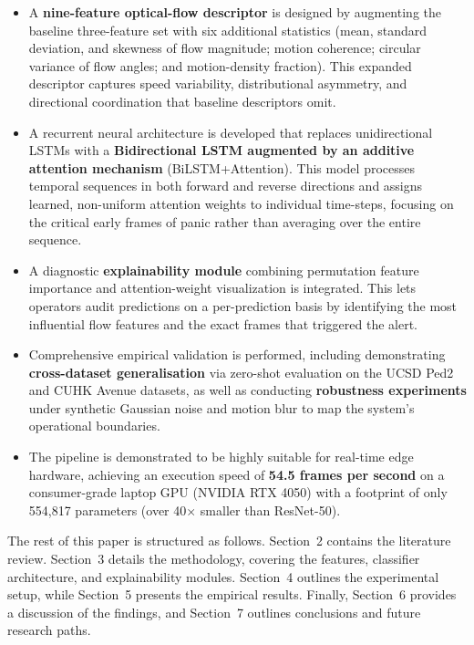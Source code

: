 \begin{itemize}
  \item A \textbf{nine-feature optical-flow descriptor} is designed by augmenting the baseline three-feature set with six additional statistics (mean, standard deviation, and skewness of flow magnitude; motion coherence; circular variance of flow angles; and motion-density fraction). This expanded descriptor captures speed variability, distributional asymmetry, and directional coordination that baseline descriptors omit.

  \item A recurrent neural architecture is developed that replaces unidirectional LSTMs with a \textbf{Bidirectional LSTM augmented by an additive attention mechanism} (BiLSTM+Attention). This model processes temporal sequences in both forward and reverse directions and assigns learned, non-uniform attention weights to individual time-steps, focusing on the critical early frames of panic rather than averaging over the entire sequence.

  \item A diagnostic \textbf{explainability module} combining permutation feature importance and attention-weight visualization is integrated. This lets operators audit predictions on a per-prediction basis by identifying the most influential flow features and the exact frames that triggered the alert.

  \item Comprehensive empirical validation is performed, including demonstrating \textbf{cross-dataset generalisation} via zero-shot evaluation on the UCSD Ped2 and CUHK Avenue datasets, as well as conducting \textbf{robustness experiments} under synthetic Gaussian noise and motion blur to map the system's operational boundaries.

  \item The pipeline is demonstrated to be highly suitable for real-time edge hardware, achieving an execution speed of \textbf{54.5 frames per second} on a consumer-grade laptop GPU (NVIDIA RTX 4050) with a footprint of only 554{,}817 parameters (over 40$\times$ smaller than ResNet-50).
\end{itemize}

The rest of this paper is structured as follows. Section~2 contains the literature review. Section~3 details the methodology, covering the features, classifier architecture, and explainability modules. Section~4 outlines the experimental setup, while Section~5 presents the empirical results. Finally, Section~6 provides a discussion of the findings, and Section~7 outlines conclusions and future research paths.
